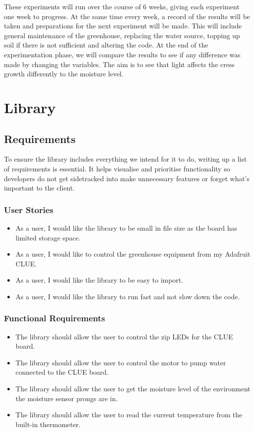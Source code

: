 These experiments will run over the course of 6 weeks, giving each experiment one week to progress. At the same time every week, a record of the results will be taken and preparations for the next experiment will be made. This will include general maintenance of the greenhouse, replacing the water source, topping up soil if there is not sufficient and altering the code. At the end of the experimentation phase, we will compare the results to see if any difference was made by changing the variables. The aim is to see that light affects the cress growth differently to the moisture level.

\section{Library}

\subsection{Requirements}

To ensure the library includes everything we intend for it to do, writing up a list of requirements is essential. It helps visualise and prioritise functionality so developers do not get sidetracked into make unnecessary features or forget what's important to the client.

\subsubsection{User Stories}

\begin{itemize}
    \item As a user, I would like the library to be small in file size as the board has limited storage space.
    \item As a user, I would like to control the greenhouse equipment from my Adafruit CLUE.
    \item As a user, I would like the library to be easy to import.
    \item As a user, I would like the library to run fast and not slow down the code.
\end{itemize}

\subsubsection{Functional Requirements}
\begin{itemize}
    \item The library should allow the user to control the zip LEDs for the CLUE board.    
    \item The library should allow the user to control the motor to pump water connected to the CLUE board.
    \item The library should allow the user to get the moisture level of the environment the moisture sensor prongs are in.
    \item The library should allow the user to read the current temperature from the built-in thermometer.
\end{itemize}

